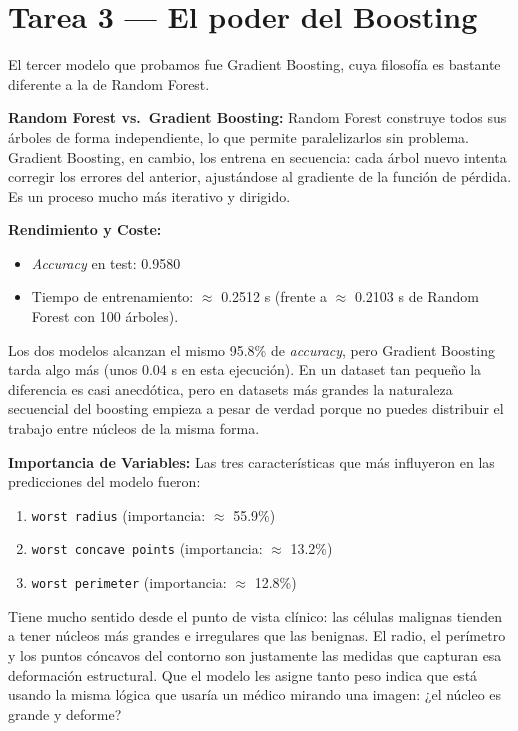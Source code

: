 \documentclass[../../__memoria.tex]{subfiles}
\begin{document}
\section[Tarea 3: Boosting]{Tarea 3 --- El poder del Boosting}

El tercer modelo que probamos fue Gradient Boosting, cuya filosofía es bastante diferente a la de Random Forest.

\textbf{Random Forest vs.\ Gradient Boosting:}
Random Forest construye todos sus árboles de forma independiente, lo que permite paralelizarlos sin problema. Gradient Boosting, en cambio, los entrena en secuencia: cada árbol nuevo intenta corregir los errores del anterior, ajustándose al gradiente de la función de pérdida. Es un proceso mucho más iterativo y dirigido.

\textbf{Rendimiento y Coste:}
\begin{itemize}
    \item \textit{Accuracy} en test: 0.9580
    \item Tiempo de entrenamiento: $\approx$ 0.2512 s (frente a $\approx$ 0.2103 s de Random Forest con 100 árboles).
\end{itemize}
Los dos modelos alcanzan el mismo 95.8\% de \textit{accuracy}, pero Gradient Boosting tarda algo más (unos 0.04 s en esta ejecución). En un dataset tan pequeño la diferencia es casi anecdótica, pero en datasets más grandes la naturaleza secuencial del boosting empieza a pesar de verdad porque no puedes distribuir el trabajo entre núcleos de la misma forma.

\textbf{Importancia de Variables:}
Las tres características que más influyeron en las predicciones del modelo fueron:
\begin{enumerate}
    \item \texttt{worst radius} (importancia: $\approx$ 55.9\%)
    \item \texttt{worst concave points} (importancia: $\approx$ 13.2\%)
    \item \texttt{worst perimeter} (importancia: $\approx$ 12.8\%)
\end{enumerate}

Tiene mucho sentido desde el punto de vista clínico: las células malignas tienden a tener núcleos más grandes e irregulares que las benignas. El radio, el perímetro y los puntos cóncavos del contorno son justamente las medidas que capturan esa deformación estructural. Que el modelo les asigne tanto peso indica que está usando la misma lógica que usaría un médico mirando una imagen: ¿el núcleo es grande y deforme?
\end{document}
